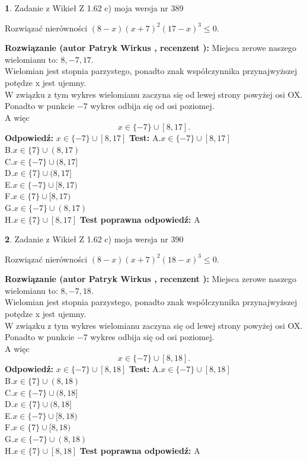 \documentclass[12pt, a4paper]{article}
\theoremstyle{definition} %
\newtheorem{zad}{}
\newcommand{\zadStart}[1]{\begin{zad}#1\newline}
\newcommand{\zadStop}{\end{zad}}
\newcommand{\rozwStart}[2]{\noindent \textbf{Rozwiązanie (autor #1 , recenzent #2): }\newline}
\newcommand{\rozwStop}{\newline}
\newcommand{\odpStart}{\noindent \textbf{Odpowiedź:}\newline}
\newcommand{\odpStop}{\newline}
\newcommand{\testStart}{\noindent \textbf{Test:}\newline}
\newcommand{\testStop}{\newline}
\newcommand{\kluczStart}{\noindent \textbf{Test poprawna odpowiedź:}\newline}
\newcommand{\kluczStop}{\newline}
\begin{document}
\zadStart{Zadanie z Wikieł Z 1.62 c) moja wersja nr 389}

Rozwiązać nierówności $(8-x)(x+7)^{2}(17-x)^{3}\le0$.
\zadStop
\rozwStart{Patryk Wirkus}{}
Miejsca zerowe naszego wielomianu to: $8, -7, 17$.\\
Wielomian jest stopnia parzystego, ponadto znak współczynnika przy\linebreak najwyższej potędze x jest ujemny.\\ W związku z tym wykres wielomianu zaczyna się od lewej strony powyżej osi OX.\\
Ponadto w punkcie $-7$ wykres odbija się od osi poziomej.\\
A więc $$x \in \{-7\} \cup [8,17].$$
\rozwStop
\odpStart
$x \in \{-7\} \cup [8,17]$
\odpStop
\testStart
A.$x \in \{-7\} \cup [8,17]$\\
B.$x \in \{7\} \cup (8,17)$\\
C.$x \in \{-7\} \cup (8,17]$\\
D.$x \in \{7\} \cup (8,17]$\\
E.$x \in \{-7\} \cup [8,17)$\\
F.$x \in \{7\} \cup [8,17)$\\
G.$x \in \{-7\} \cup (8,17)$\\
H.$x \in \{7\} \cup [8,17]$
\testStop
\kluczStart
A
\kluczStop



\zadStart{Zadanie z Wikieł Z 1.62 c) moja wersja nr 390}

Rozwiązać nierówności $(8-x)(x+7)^{2}(18-x)^{3}\le0$.
\zadStop
\rozwStart{Patryk Wirkus}{}
Miejsca zerowe naszego wielomianu to: $8, -7, 18$.\\
Wielomian jest stopnia parzystego, ponadto znak współczynnika przy\linebreak najwyższej potędze x jest ujemny.\\ W związku z tym wykres wielomianu zaczyna się od lewej strony powyżej osi OX.\\
Ponadto w punkcie $-7$ wykres odbija się od osi poziomej.\\
A więc $$x \in \{-7\} \cup [8,18].$$
\rozwStop
\odpStart
$x \in \{-7\} \cup [8,18]$
\odpStop
\testStart
A.$x \in \{-7\} \cup [8,18]$\\
B.$x \in \{7\} \cup (8,18)$\\
C.$x \in \{-7\} \cup (8,18]$\\
D.$x \in \{7\} \cup (8,18]$\\
E.$x \in \{-7\} \cup [8,18)$\\
F.$x \in \{7\} \cup [8,18)$\\
G.$x \in \{-7\} \cup (8,18)$\\
H.$x \in \{7\} \cup [8,18]$
\testStop
\kluczStart
A
\kluczStop
\end{document}
